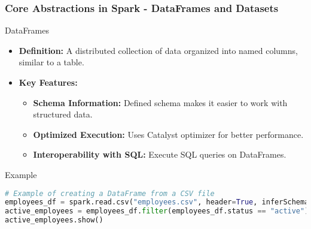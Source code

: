 \documentclass[aspectratio=169]{beamer}
\begin{document}
\begin{frame}[fragile]
    \frametitle{Core Abstractions in Spark - DataFrames and Datasets}
    \begin{block}{DataFrames}
        \begin{itemize}
            \item \textbf{Definition:} 
                A distributed collection of data organized into named columns, similar to a table.
            \item \textbf{Key Features:}
                \begin{itemize}
                    \item \textbf{Schema Information:} Defined schema makes it easier to work with structured data.
                    \item \textbf{Optimized Execution:} Uses Catalyst optimizer for better performance.
                    \item \textbf{Interoperability with SQL:} Execute SQL queries on DataFrames.
                \end{itemize}
        \end{itemize}
    \end{block}
    \begin{block}{Example}
        \begin{lstlisting}[language=Python]
# Example of creating a DataFrame from a CSV file
employees_df = spark.read.csv("employees.csv", header=True, inferSchema=True)
active_employees = employees_df.filter(employees_df.status == "active")
active_employees.show()
        \end{lstlisting}
    \end{block}
\end{frame}
\end{document}
